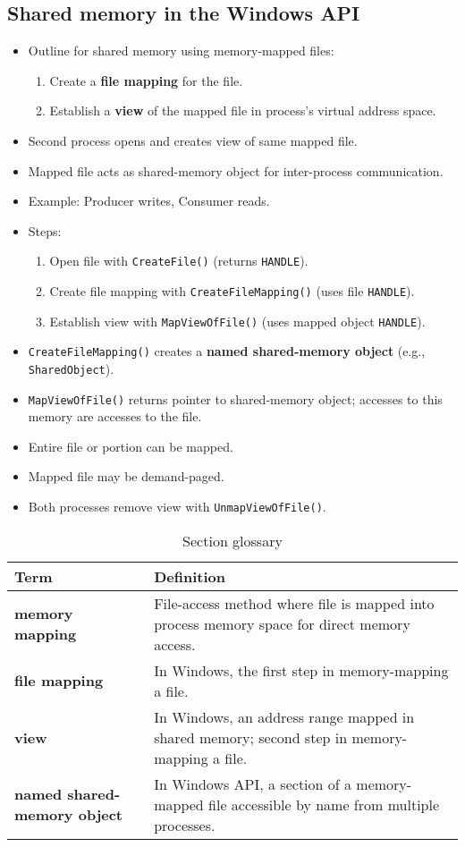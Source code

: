 \subsection{Shared memory in the Windows API}
\begin{itemize}
    \item Outline for shared memory using memory-mapped files:
    \begin{enumerate}
        \item Create a \textbf{file mapping} for the file.
        \item Establish a \textbf{view} of the mapped file in process's virtual address space.
    \end{enumerate}
    \item Second process opens and creates view of same mapped file.
    \item Mapped file acts as shared-memory object for inter-process communication.
    \item Example: Producer writes, Consumer reads.
    \item Steps:
    \begin{enumerate}
        \item Open file with \texttt{CreateFile()} (returns \texttt{HANDLE}).
        \item Create file mapping with \texttt{CreateFileMapping()} (uses file \texttt{HANDLE}).
        \item Establish view with \texttt{MapViewOfFile()} (uses mapped object \texttt{HANDLE}).
    \end{enumerate}
    \item \texttt{CreateFileMapping()} creates a \textbf{named shared-memory object} (e.g., \texttt{SharedObject}).
    \item \texttt{MapViewOfFile()} returns pointer to shared-memory object; accesses to this memory are accesses to the file.
    \item Entire file or portion can be mapped.
    \item Mapped file may be demand-paged.
    \item Both processes remove view with \texttt{UnmapViewOfFile()}.
\end{itemize}

\begin{table}[h!]
\centering
\caption{Section glossary}
\label{tab:section_glossary}
\begin{tabular}{p{}p{}}
\toprule
\rowcolor{gray!20} \textbf{Term} & \textbf{Definition} \\
\midrule
\textbf{memory mapping} & File-access method where file is mapped into process memory space for direct memory access. \\
\textbf{file mapping} & In Windows, the first step in memory-mapping a file. \\
\textbf{view} & In Windows, an address range mapped in shared memory; second step in memory-mapping a file. \\
\textbf{named shared-memory object} & In Windows API, a section of a memory-mapped file accessible by name from multiple processes. \\
\bottomrule
\end{tabular}
\end{table}
